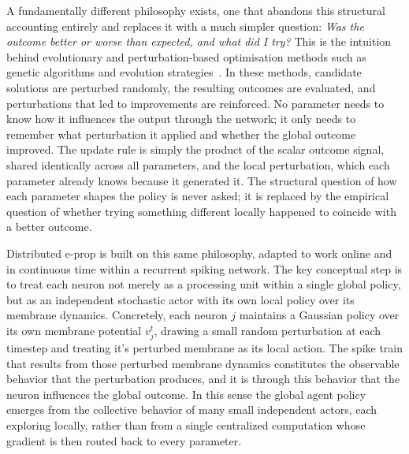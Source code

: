     A fundamentally different philosophy exists, one that abandons this structural accounting
    entirely and replaces it with a much simpler question: \emph{Was the outcome better or worse than expected, and what did I try?} This is the intuition behind evolutionary and
    perturbation-based optimisation methods such as genetic algorithms and evolution
    strategies~\cite{salimans2017evolutionstrategiesscalablealternative}. In these methods, candidate solutions are
    perturbed randomly, the resulting outcomes are evaluated, and perturbations that led to
    improvements are reinforced. No parameter needs to know how it influences the output
    through the network; it only needs to remember what perturbation it applied and whether
    the global outcome improved. The update rule is simply the product of the scalar outcome
    signal, shared identically across all parameters, and the local perturbation, which each
    parameter already knows because it generated it. The structural question of how each
    parameter shapes the policy is never asked; it is replaced by the empirical question of
    whether trying something different locally happened to coincide with a better outcome.
    
    Distributed e-prop is built on this same philosophy, adapted to work online and in
    continuous time within a recurrent spiking network. The key conceptual step is to treat
    each neuron not merely as a processing unit within a single global policy, but as an
    independent stochastic actor with its own local policy over its membrane dynamics.
    Concretely, each neuron $j$ maintains a Gaussian policy over its own membrane potential $v_j^t$, drawing a small
    random perturbation at each timestep and treating it's perturbed membrane as its local action.
    The spike train that results from those perturbed membrane dynamics constitutes the
    observable behavior that the perturbation produces, and it is through this behavior
    that the neuron influences the global outcome. In this sense the global agent policy
    emerges from the collective behavior of many small independent actors, each exploring
    locally, rather than from a single centralized computation whose gradient is then routed
    back to every parameter.
    
